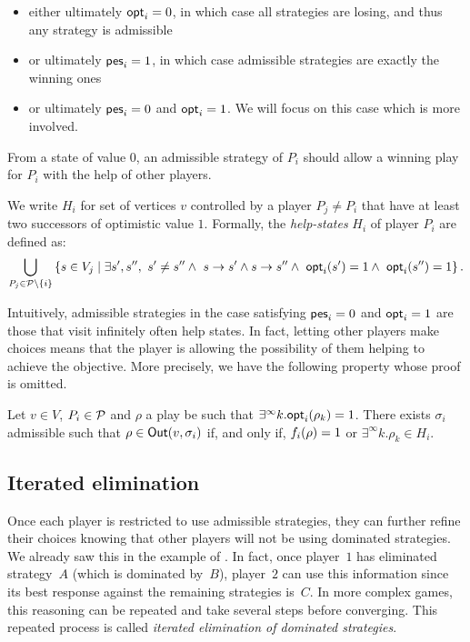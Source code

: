 \begin{itemize}
\item
  either ultimately \(\textsf{opt}_i = 0\), in which case all strategies are
  losing, and thus any strategy is admissible
\item
  or ultimately \(\textsf{pes}_i = 1\), in which case admissible strategies are
  exactly the winning ones
\item
  or ultimately \(\textsf{pes}_i = 0\) and \(\textsf{opt}_i = 1\). We will focus on this
case which is more involved.
\end{itemize}

From a state of value \(0\), an admissible strategy of \(P_i\) should
allow a winning play for \(P_i\) with the help of other players.

We write \(H_i\) for set of vertices \(v\) controlled by a player
\(P_j\ne P_i\) that have at least two successors of optimistic value
\(1\). Formally, the \emph{help-states} $H_i$ of player \(P_i\) are defined
as:
\[
 \bigcup_{P_j\in \mathcal{P} \setminus\{i\}} \left\{ s \in V_j \mid \exists s',s'',\ s' \neq s'' \wedge\ s\rightarrow s' \land s \rightarrow s'' \wedge\ \textsf{opt}_i(s') = 1 \wedge\ \textsf{opt}_i(s'') = 1 \right\}.
\]

Intuitively, admissible strategies in the case satisfying \(\textsf{pes}_i = 0\) and \(\textsf{opt}_i = 1\)
are those that visit infinitely often help states. In fact, letting other players make choices
means that the player is allowing the possibility of them helping to achieve the objective.
More precisely, we have the following property whose proof is omitted.
\begin{lemma}
Let \(v\in V\), \(P_i\in \mathcal{P}\) and \(\rho\) a play be
such that \(\exists^\infty k. \textsf{opt}_{i}(\rho_k) = 1\). There exists
\(\sigma_i\) admissible such that \(\rho \in \textsf{Out}(v, \sigma_i)\) if, and
only if, \(f_i(\rho) = 1\) or
\(\exists^\infty k. \rho_k \in H_i\).
\end{lemma}

\subsection{Iterated elimination}\label{iterated-elimination}

Once each player is restricted to use admissible strategies, they can
further refine their choices knowing that other players will not be using dominated strategies.
We already saw this in the example of .
In fact, once player~$1$ has eliminated strategy~$A$ (which is dominated by~$B$),
player~$2$ can use this information since its best response against the remaining strategies is~$C$.
In more complex games, this reasoning can be repeated and take several steps before converging.
This repeated process is called \emph{iterated elimination of dominated strategies}.

